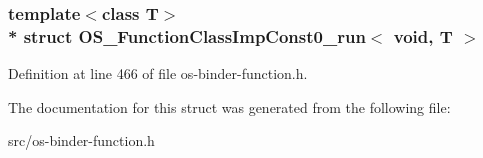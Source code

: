 \subsubsection*{template$<$class T$>$\\*
struct O\+S\+\_\+\+Function\+Class\+Imp\+Const0\+\_\+run$<$ void, T                           $>$}



Definition at line 466 of file os-\/binder-\/function.\+h.



The documentation for this struct was generated from the following file\+:\begin{DoxyCompactItemize}
\item 
src/os-\/binder-\/function.\+h\end{DoxyCompactItemize}
